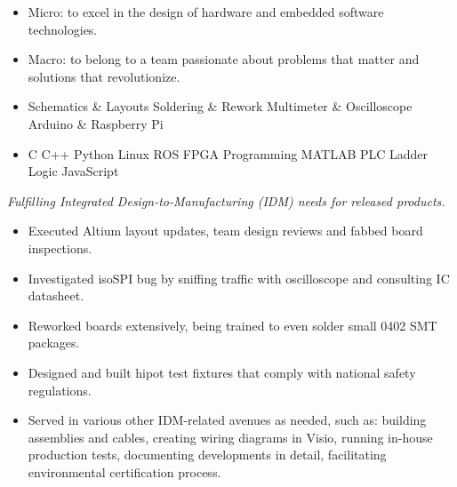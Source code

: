 \documentclass{resume}
\begin{document}




\begin{itemize}[parsep=0.5ex]
  \item Micro: to excel in the design of hardware and embedded software technologies.
  \item Macro: to belong to a team passionate about problems that matter and solutions that revolutionize.
\end{itemize}


\begin{itemize}[parsep=0.5ex]
  \item %
  Schematics \& Layouts\textperiodcentered
  Soldering \& Rework\textperiodcentered
  Multimeter \& Oscilloscope\textperiodcentered
  Arduino \& Raspberry Pi

  \item %
  C\textperiodcentered 
  C++\textperiodcentered
  Python\textperiodcentered
  Linux\textperiodcentered
  ROS\textperiodcentered
  FPGA Programming\textperiodcentered
  MATLAB\textperiodcentered
  PLC Ladder Logic\textperiodcentered
  JavaScript%

\end{itemize}


\textit{Fulfilling Integrated Design-to-Manufacturing (IDM) needs for released products.}
\begin{itemize}
  \item Executed Altium layout updates, team design reviews and fabbed board inspections.
  \item Investigated isoSPI bug by sniffing traffic with oscilloscope and consulting IC datasheet.
  \item Reworked boards extensively, being trained to even solder small 0402 SMT packages.
  \item Designed and built hipot test fixtures that comply with national safety regulations.
  \item Served in various other IDM-related avenues as needed, such as: building assemblies and cables, creating wiring diagrams in Visio, running in-house production tests, documenting developments in detail, facilitating environmental certification process.
\end{itemize}
\end{document}

